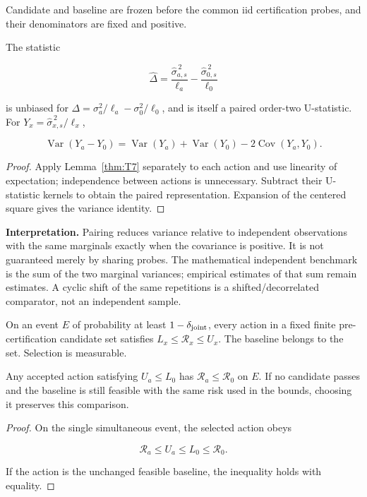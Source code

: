\begin{proposition}\label{thm:T8}
Candidate and baseline are frozen before the common iid certification probes, and their denominators are fixed and positive.


The statistic


\begin{equation}
\widehat\Delta=\frac{\widehat\sigma_{a,s}^{\,2}}{\ell_a}
-\frac{\widehat\sigma_{0,s}^{\,2}}{\ell_0}
\end{equation}


is unbiased for $\Delta=\sigma_a^2/\ell_a-\sigma_0^2/\ell_0$, and is itself a paired order-two U-statistic. For $Y_x=\widehat\sigma_{x,s}^{\,2}/\ell_x$,


\begin{equation}
\operatorname{Var}(Y_a-Y_0)=\operatorname{Var}(Y_a)+\operatorname{Var}(Y_0)-2\operatorname{Cov}(Y_a,Y_0).
\end{equation}


\end{proposition}
\begin{proof}
Apply Lemma~\ref{thm:T7} separately to each action and use linearity of expectation; independence between actions is unnecessary. Subtract their U-statistic kernels to obtain the paired representation. Expansion of the centered square gives the variance identity.

\end{proof}


\textbf{Interpretation.} Pairing reduces variance relative to independent observations with the same marginals exactly when the covariance is positive. It is not guaranteed merely by sharing probes. The mathematical independent benchmark is the sum of the two marginal variances; empirical estimates of that sum remain estimates. A cyclic shift of the same repetitions is a shifted/decorrelated comparator, not an independent sample.

\begin{proposition}\label{thm:T9}
On an event $E$ of probability at least $1-\delta_{\rm joint}$, every action in a fixed finite pre-certification candidate set satisfies $L_x\le\mathcal R_x\le U_x$. The baseline belongs to the set. Selection is measurable.


Any accepted action satisfying $U_a\le L_0$ has $\mathcal R_a\le\mathcal R_0$ on $E$. If no candidate passes and the baseline is still feasible with the same risk used in the bounds, choosing it preserves this comparison.


\end{proposition}
\begin{proof}
On the single simultaneous event, the selected action obeys


\begin{equation}
\mathcal R_a\le U_a\le L_0\le\mathcal R_0.
\end{equation}


If the action is the unchanged feasible baseline, the inequality holds with equality.

\end{proof}


